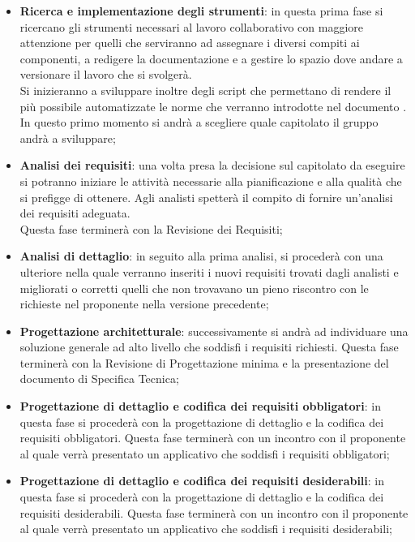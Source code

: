 		\begin{itemize}
			\item \textbf{Ricerca e implementazione degli strumenti}: in questa prima fase si ricercano gli strumenti necessari al lavoro collaborativo con maggiore attenzione per quelli che serviranno ad assegnare i diversi compiti ai componenti, a redigere la documentazione e a gestire lo spazio dove andare a versionare il lavoro che si svolgerà. \\
			Si inizieranno a sviluppare inoltre degli script che permettano di rendere il più possibile automatizzate le norme che verranno introdotte nel documento \docNameVersionNdP. \\
			In questo primo momento si andrà a scegliere quale capitolato il gruppo andrà a sviluppare;

			\item \textbf{Analisi dei requisiti}: una volta presa la decisione sul capitolato da eseguire si potranno iniziare le attività necessarie alla pianificazione e alla qualità che si prefigge di ottenere.
			Agli analisti spetterà il compito di fornire un'analisi dei requisiti adeguata.\\
			Questa fase terminerà con la Revisione dei Requisiti;

			\item \textbf{Analisi di dettaglio}: in seguito alla prima analisi, si procederà con una ulteriore nella quale verranno inseriti i nuovi requisiti trovati dagli analisti e migliorati o corretti quelli che non trovavano un pieno riscontro con le richieste nel proponente nella versione precedente;
			
			\item \textbf{Progettazione architetturale}: successivamente si andrà ad individuare una soluzione generale ad alto livello che soddisfi i requisiti richiesti. Questa fase terminerà con la Revisione di Progettazione minima e la presentazione del documento di Specifica Tecnica;

			\item \textbf{Progettazione di dettaglio e codifica dei requisiti obbligatori}: in questa fase si procederà con la progettazione di dettaglio e la codifica dei requisiti obbligatori. Questa fase terminerà con un incontro con il proponente al quale verrà presentato un applicativo che soddisfi i requisiti obbligatori;
			
			\item \textbf{Progettazione di dettaglio e codifica dei requisiti desiderabili}: in questa fase si procederà con la progettazione di dettaglio e la codifica dei requisiti desiderabili. Questa fase terminerà con un incontro con il proponente al quale verrà presentato un applicativo che soddisfi i requisiti desiderabili;
			

\end{itemize}

